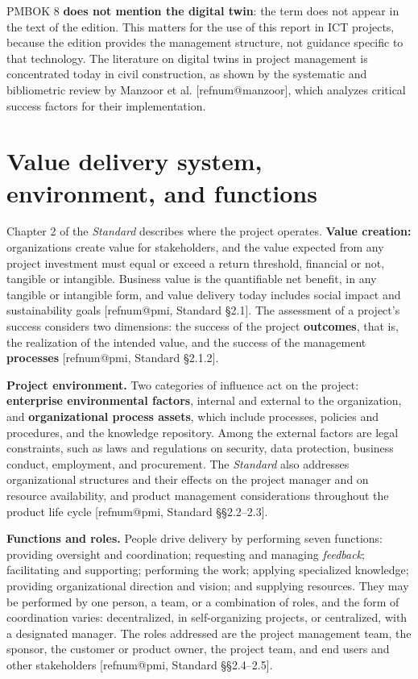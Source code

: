 \documentclass[11pt,a4paper]{article}
\makeatletter
\newcommand{\refnum}[1]{\csname refnum@#1\endcsname}
\makeatother
\begin{document}
PMBOK 8 \textbf{does not mention the digital twin}: the term does not appear in the text of the edition. This matters for the use of this report in ICT projects, because the edition provides the management structure, not guidance specific to that technology. The literature on digital twins in project management is concentrated today in civil construction, as shown by the systematic and bibliometric review by Manzoor et al. [\refnum{manzoor}], which analyzes critical success factors for their implementation.

\section{Value delivery system, environment, and functions}

Chapter 2 of the \textit{Standard} describes where the project operates. \textbf{Value creation:} organizations create value for stakeholders, and the value expected from any project investment must equal or exceed a return threshold, financial or not, tangible or intangible. Business value is the quantifiable net benefit, in any tangible or intangible form, and value delivery today includes social impact and sustainability goals [\refnum{pmi}, Standard §2.1]. The assessment of a project's success considers two dimensions: the success of the project \textbf{outcomes}, that is, the realization of the intended value, and the success of the management \textbf{processes} [\refnum{pmi}, Standard §2.1.2].

\textbf{Project environment.} Two categories of influence act on the project: \textbf{enterprise environmental factors}, internal and external to the organization, and \textbf{organizational process assets}, which include processes, policies and procedures, and the knowledge repository. Among the external factors are legal constraints, such as laws and regulations on security, data protection, business conduct, employment, and procurement. The \textit{Standard} also addresses organizational structures and their effects on the project manager and on resource availability, and product management considerations throughout the product life cycle [\refnum{pmi}, Standard §§2.2–2.3].

\textbf{Functions and roles.} People drive delivery by performing seven functions: providing oversight and coordination; requesting and managing \textit{feedback}; facilitating and supporting; performing the work; applying specialized knowledge; providing organizational direction and vision; and supplying resources. They may be performed by one person, a team, or a combination of roles, and the form of coordination varies: decentralized, in self-organizing projects, or centralized, with a designated manager. The roles addressed are the project management team, the sponsor, the customer or product owner, the project team, and end users and other stakeholders [\refnum{pmi}, Standard §§2.4–2.5].
\end{document}

